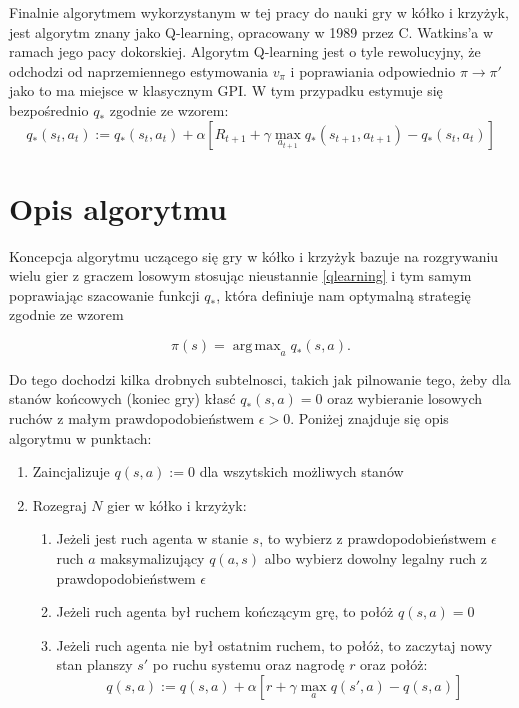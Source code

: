 \documentclass[licencjacka]{pracamgr}
\DeclareMathOperator*{\argmax}{arg\,max}
\begin{document}
 Finalnie algorytmem wykorzystanym w tej pracy do nauki gry w kółko i krzyżyk, jest algorytm znany jako Q-learning, opracowany w 1989 przez C. Watkins'a \cite{Watkins} w ramach jego  pacy dokorskiej. Algorytm Q-learning jest o tyle rewolucyjny, że odchodzi od naprzemiennego estymowania $v_{\pi}$ i poprawiania odpowiednio $\pi\rightarrow \pi'$ jako to ma miejsce w klasycznym GPI. W tym przypadku estymuje się bezpośrednio $q_{*}$ zgodnie ze wzorem:
 \begin{equation}\label{qlearning}
 	 q_{*}(s_{t}, a_{t}) := q_{*}(s_{t},a_{t}) +\alpha [R_{t+1} + \gamma \max_{a_{t+1}} q_{*}(s_{t+1}, a_{t+1}) - q_{*}(s_{t},a_{t})]
 \end{equation} 
 
 

\section{Opis algorytmu}

Koncepcja algorytmu uczącego się gry w kółko i krzyżyk bazuje na rozgrywaniu wielu gier z graczem losowym stosując nieustannie \ref{qlearning} i tym samym poprawiając szacowanie funkcji $q_{*}$, która definiuje nam optymalną strategię zgodnie ze wzorem

$$\pi(s) = \argmax_{a}q_{*}(s,a).$$

Do tego dochodzi kilka drobnych subtelnosci, takich jak pilnowanie tego, żeby dla stanów końcowych (koniec gry)  kłasć $q_{*}(s,a)=0$ oraz wybieranie losowych ruchów z małym prawdopodobieństwem $\epsilon>0$. Poniżej znajduje się opis algorytmu w punktach:

\begin{enumerate}
	\item{Zaincjalizuje $q(s,a):=0$ dla wszytskich możliwych stanów}
	\item{Rozegraj $N$ gier w kółko i krzyżyk:}
		\begin{enumerate}
			\item{Jeżeli jest ruch agenta w stanie $s$, to wybierz z prawdopodobieństwem $\epsilon$ ruch $a$ maksymalizujący $q(a,s)$ albo wybierz dowolny legalny ruch z prawdopodobieństwem $\epsilon$}
			\item{Jeżeli ruch agenta był ruchem kończącym grę, to połóż $q(s,a)=0$}
			\item{Jeżeli ruch agenta nie był ostatnim ruchem, to połóż, to zaczytaj nowy stan planszy $s'$ po ruchu systemu oraz nagrodę $r$ oraz połóż:
				$$ q(s, a) := q(s,a) +\alpha [r + \gamma \max_{a} q(s', a) - q(s,a)]$$ }
		\end{enumerate}
\end{enumerate}
\end{document}
